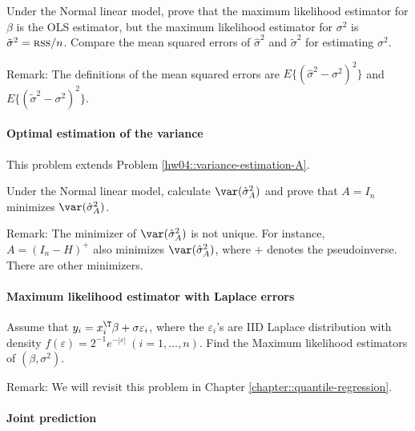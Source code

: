 Under the Normal linear model, prove that the maximum likelihood
estimator for $\beta$ is the OLS estimator, but the maximum likelihood
estimator for
$\sigma^{2}$ is $\tilde{\sigma}^{2}=\textsc{rss}/n$. Compare the
mean squared errors of $\hat{\sigma}^{2}$ and $\tilde{\sigma}^{2}$ for estimating $\sigma^2$. 


Remark: The definitions of the mean squared errors are $E\{ (\hat{\sigma}^{2} - \sigma^2)^2 \} $ and $E\{ (\tilde{\sigma}^{2} - \sigma^2)^2 \} $. 



\paragraph{Optimal estimation of the variance}
\label{hw5:optimal-A-variance-normal}

This problem extends Problem \ref{hw04::variance-estimation-A}.

Under the Normal linear model, calculate $\var(\hat{\sigma}_A^2)$ and prove that $A = I_n$ minimizes $\var(\hat{\sigma}_A^2)$. 



Remark: The minimizer of $\var(\hat{\sigma}_A^2)$ is not unique. For instance, $A = (I_n - H)^{+}$ also minimizes $\var(\hat{\sigma}_A^2)$, where $+$ denotes the pseudoinverse. There are other minimizers. 






\paragraph{Maximum likelihood estimator with Laplace errors}\label{hw5:laplace-mle}

Assume that $y_{i}=x_{i}^{\T}\beta+\sigma\varepsilon_{i}$, where the
$\varepsilon_{i}$'s are IID Laplace distribution with density
$f(\varepsilon)=2^{-1}e^{-|\varepsilon|}\ (i=1,\ldots,n)$. Find the
Maximum likelihood estimators of $(\beta,\sigma^{2}).$  


Remark: We will revisit this problem in Chapter \ref{chapter::quantile-regression}. 





\paragraph{Joint prediction}\label{hw5:joint-preduction}



